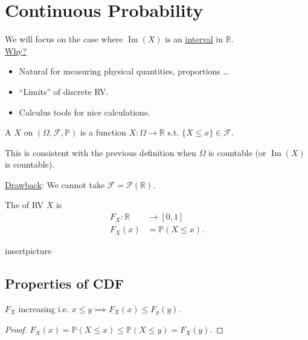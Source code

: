 \section{Continuous Probability}
We will focus on the case where $\operatorname{Im}(X)$ is an \underline{interval} in $\mathbb{R}$.\\
\underline{Why?}
\begin{itemize} \color{blue}
    \item Natural for measuring physical quantities, proportions \dots
    \item ``Limits'' of discrete RV.
    \item Calculus tools for nice calculations.
\end{itemize} 

\begin{definition}
    A  $X$ on $(\Omega, \mathcal{F}, \mathbb{P})$ is a function $X : \Omega \to \mathbb{R}$ s.t. $\{X \leq x\} \in \mathcal{F}$.
\end{definition} 
This is consistent with the previous definition when $\Omega$ is countable (or $\operatorname{Im}(X)$ is countable).

\underline{Drawback}: We cannot take $\mathcal{F} = \mathcal{P}(\mathbb{R})$.

\begin{definition}
    The  of RV $X$ is
    \begin{align*}
        F_X: \mathbb{R} &\to [0, 1] \\
        F_X(x) &= \mathbb{P}(X \leq x).
    \end{align*} 
\end{definition} 

\begin{example}
    insertpicture
\end{example} 

\subsection{Properties of CDF}

\begin{claim}
    $F_X$ increasing i.e. $x \leq y \implies F_X(x) \leq F_y(y)$.
\end{claim} 

\begin{proof}
    $F_X(x) = \mathbb{P}(X \leq x) \leq \mathbb{P}(X \leq y) = F_X(y)$.
\end{proof} 

